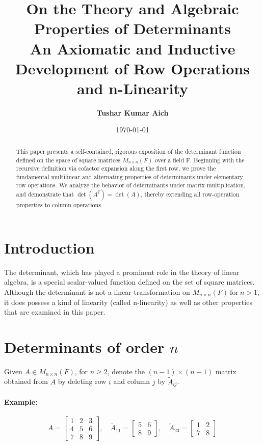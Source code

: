 \documentclass[12pt, a4paper]{article}
\title{\textbf{\Large  On the Theory and Algebraic Properties of Determinants \\ \large An Axiomatic and Inductive Development of Row Operations and n-Linearity }}
\author{\textbf{Tushar Kumar Aich}}
\date{\today}
\theoremstyle{definition}
\theoremstyle{remark}
\begin{document}
\maketitle

\begin{abstract}
    This paper presents a self-contained, rigorous exposition of the determinant function defined on the space of square matrices $M_{n\times n}(F)$ over a field F. Beginning with the recursive definition via cofactor expansion along the first row, we prove the fundamental multilinear and alternating properties of determinants under elementary row operations. We analyze the behavior of determinants under matrix multiplication, and demonstrate that $\det(A^T) = \det(A)$, thereby extending all row-operation properties to column operations.
    \end{abstract}

    \section{Introduction}
    The determinant, which has played a prominent role in the theory of linear algebra, is a special scalar-valued function defined on the set of square matrices. Although the determinant is not a linear transformation on $M_{n \times n}(F) \ \text{for} \ n > 1$, it does possess a kind of linearity (called n-linearity) as well as other properties that are examined in this paper.

    \section{Determinants of order $n$}
    Given $A \in M_{n \times n}(F)$, for $n \ge 2$, denote the $(n-1) \times (n-1)$ matrix obtained from $A$ by deleting row $i$ and column $j$ by $\widetilde{A}_{ij}$.

    \paragraph{Example:}
    \[
    A = \begin{bmatrix}
    1 & 2 & 3 \\
    4 & 5 & 6 \\
    7 & 8 & 9
    \end{bmatrix}, \quad
    \widetilde{A}_{11} = \begin{bmatrix}
    5 & 6 \\
    8 & 9
    \end{bmatrix}, \quad
    \widetilde{A}_{23} = \begin{bmatrix}
    1 & 2 \\
    7 & 8
    \end{bmatrix}
    \]
\end{document}
